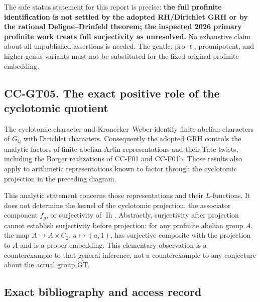 The safe status statement for this report is precise: \textbf{the full
profinite identification is not settled by the adopted RH/Dirichlet GRH
or by the rational Deligne--Drinfeld theorem; the inspected 2026 primary
profinite work treats full surjectivity as unresolved.} No exhaustive
claim about all unpublished assertions is needed. The gentle,
pro-\(\ell\), prounipotent, and higher-genus variants must not be
substituted for the fixed original profinite embedding.

\subsection{CC-GT05. The exact positive role of the cyclotomic
quotient}\label{cc-gt05.-the-exact-positive-role-of-the-cyclotomic-quotient}

The cyclotomic character and Kronecker--Weber identify finite abelian
characters of \(G_{\mathbb Q}\) with Dirichlet characters. Consequently
the adopted GRH controls the analytic factors of finite abelian Artin
representations and their Tate twists, including the Borger realizations
of CC-F01 and CC-F01b. Those results also apply to arithmetic
representations known to factor through the cyclotomic projection in the
preceding diagram.

This analytic statement concerns those representations and their
\(L\)-functions. It does not determine the kernel of the cyclotomic
projection, the associator component \(f_g\), or surjectivity of
\(\operatorname{Ih}\). Abstractly, surjectivity after projection cannot
establish surjectivity before projection: for any profinite abelian
group \(A\), the map \(A\to A\times C_2\), \(a\mapsto(a,1)\), has
surjective composite with the projection to \(A\) and is a proper
embedding. This elementary observation is a counterexample to that
general inference, not a counterexample to any conjecture about the
actual group \(\widehat{\mathrm{GT}}\).

\subsection{Exact bibliography and access
record}\label{exact-bibliography-and-access-record}

